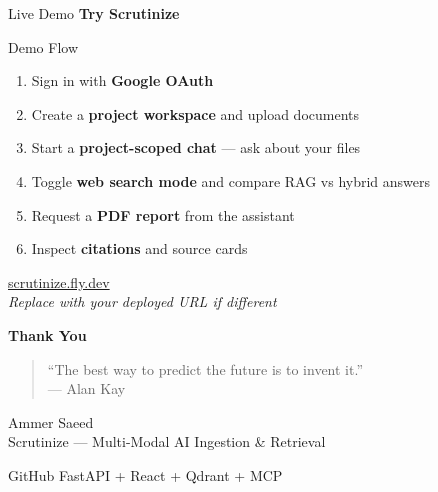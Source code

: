 \documentclass[aspectratio=169,11pt]{beamer}
\begin{document}
\begin{frame}{Live Demo}
  \centering
  \Large\textbf{Try Scrutinize}

  \vspace{1em}
  \begin{block}{Demo Flow}
    \begin{enumerate}
      \item Sign in with \textbf{Google OAuth}
      \item Create a \textbf{project workspace} and upload documents
      \item Start a \textbf{project-scoped chat} --- ask about your files
      \item Toggle \textbf{web search mode} and compare RAG vs hybrid answers
      \item Request a \textbf{PDF report} from the assistant
      \item Inspect \textbf{citations} and source cards
    \end{enumerate}
  \end{block}

  \vspace{0.8em}
  \href{https://scrutinize.fly.dev}{\large scrutinize.fly.dev}\\[0.3em]
  {\small\textit{Replace with your deployed URL if different}}
\end{frame}

\begin{frame}[plain]
  \centering
  \vspace{1.5cm}
  {\Huge\bfseries Thank You}

  \vspace{1.2cm}
  \begin{quote}
    \large
    ``The best way to predict the future is to invent it.''\\[0.4em]
    \normalsize --- Alan Kay
  \end{quote}

  \vspace{1.2cm}
  {\large Ammer Saeed}\\[0.2em]
  {\normalsize Scrutinize --- Multi-Modal AI Ingestion \& Retrieval}

  \vspace{0.8cm}
  \small
  GitHub \textbar{} FastAPI + React + Qdrant + MCP
\end{frame}
\end{document}
